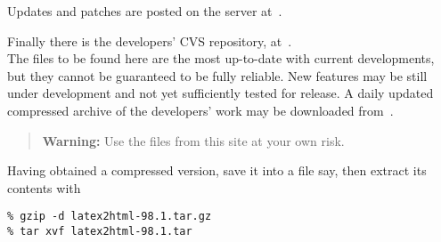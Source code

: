 %
\smallskip\noindent
Updates and patches are posted on the \latextohtml{} server at \patches\,.

\bigskip
{}\label{cvsrepos}%
\noindent
Finally there is the \latextohtml{} developers' CVS repository, at \CVSrepos\,.\\
The files to be found here are the most up-to-date with current developments,
but they cannot be guaranteed to be fully reliable. New features may be
still under development and not yet sufficiently tested for release.
A daily updated compressed archive of the developers' work may be
downloaded from \CVSlatest\,.

\begin{quote}
\textbf{Warning: }Use the files from this site at your own risk.
\end{quote}%

\htmlrule{}%
\medskip\noindent
Having obtained a compressed  version, save it into a file 
 say,
then extract its contents with 
\begin{small}
\begin{verbatim}
% gzip -d latex2html-98.1.tar.gz
% tar xvf latex2html-98.1.tar
\end{verbatim} 
\end{small}
%

